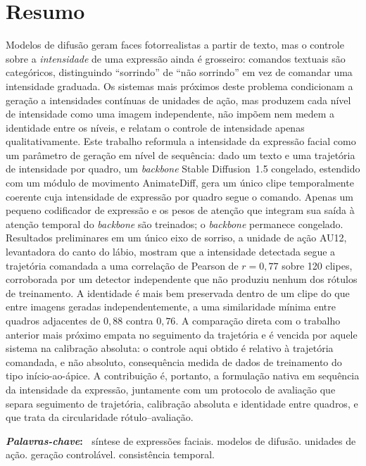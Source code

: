\chapter*{Resumo}


\noindent Modelos de difusão geram faces fotorrealistas a partir de texto, mas o controle sobre a
\emph{intensidade} de uma expressão ainda é grosseiro: comandos textuais são categóricos,
distinguindo ``sorrindo'' de ``não sorrindo'' em vez de comandar uma intensidade graduada. Os
sistemas mais próximos deste problema condicionam a geração a intensidades contínuas de unidades
de ação, mas produzem cada nível de intensidade como uma imagem independente, não impõem nem medem
a identidade entre os níveis, e relatam o controle de intensidade apenas qualitativamente. Este
trabalho reformula a intensidade da expressão facial como um parâmetro de geração em nível de
sequência: dado um texto e uma trajetória de intensidade por quadro, um \emph{backbone} Stable
Diffusion~1.5 congelado, estendido com um módulo de movimento AnimateDiff, gera um único clipe
temporalmente coerente cuja intensidade de expressão por quadro segue o comando. Apenas um pequeno
codificador de expressão e os pesos de atenção que integram sua saída à atenção temporal do
\emph{backbone} são treinados; o \emph{backbone} permanece congelado. Resultados preliminares em um
único eixo de sorriso, a unidade de ação AU12, levantadora do canto do lábio, mostram que a
intensidade detectada segue a trajetória comandada a uma correlação de Pearson de
$r = 0{,}77$ sobre 120 clipes, corroborada por um detector independente que não produziu
nenhum dos rótulos de treinamento. A identidade é mais bem preservada dentro de um clipe do
que entre imagens geradas independentemente, a uma similaridade mínima entre quadros
adjacentes de $0{,}88$ contra $0{,}76$. A comparação direta com o trabalho anterior mais
próximo empata no seguimento da trajetória e é vencida por aquele sistema na calibração
absoluta: o controle aqui obtido é relativo à trajetória comandada, e não absoluto,
consequência medida de dados de treinamento do tipo início-ao-ápice. A contribuição é, portanto, a formulação nativa em sequência da intensidade da expressão, juntamente com um protocolo de avaliação que separa seguimento de trajetória, calibração absoluta e identidade entre quadros, e que trata da circularidade rótulo--avaliação.

\vspace{1em}
\noindent\textbf{\textit{Palavras-chave}:~} síntese de expressões faciais. modelos de difusão. unidades de ação. geração controlável. consistência temporal.
